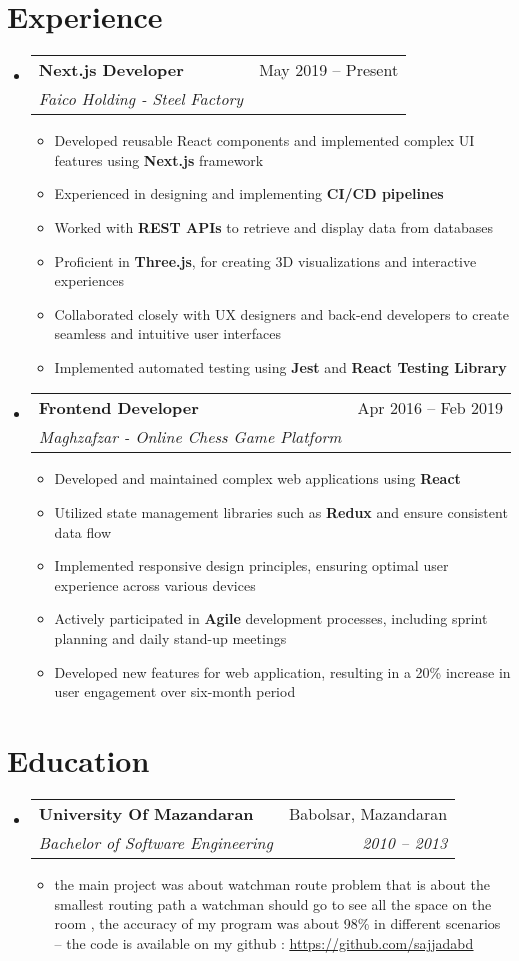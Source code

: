 \documentclass[a4paper,11pt]{article}
\makeatletter
\newcommand{\resumeItem}[1]{
  \item\small{#1}
}
\newcommand{\resumeItemListStart}{\begin{itemize}[rightmargin=0.11in]}
\newcommand{\resumeItemListEnd}{\end{itemize}}
\newcommand{\resumeQuadHeading}[4]{
  \item
  \begin{tabular*}{0.96\textwidth}[t]{l@{\extracolsep{\fill}}r}
    \textbf{#1} & #2 \\
    \textit{\small#3} & \textit{\small #4} \\
  \end{tabular*}
}
\newcommand{\resumeHeadingListStart}{
  \begin{itemize}[leftmargin=0.15in, label={}]
}
\newcommand{\resumeHeadingListEnd}{\end{itemize}}
\makeatother
\begin{document}

\section{Experience}
\resumeHeadingListStart{}
  \resumeQuadHeading{Next.js Developer}{May 2019 -- Present}
  {Faico Holding - Steel Factory}{}
    \resumeItemListStart{}
      \resumeItem{Developed reusable React components and implemented complex UI features using \textbf{Next.js} framework}
      \resumeItem{Experienced in designing and implementing \textbf{CI/CD pipelines} }
            \resumeItem{Worked with \textbf{REST APIs} to retrieve and display data from databases}
      \resumeItem{Proficient in \textbf{Three.js}, for creating 3D visualizations and interactive experiences}
      \resumeItem{Collaborated closely with UX designers and back-end developers to create seamless and intuitive user interfaces}
      \resumeItem{Implemented automated testing using \textbf{Jest} and \textbf{React Testing Library}}
    \resumeItemListEnd{}

  \resumeQuadHeading{Frontend Developer}{Apr 2016 -- Feb 2019}
  {Maghzafzar - Online Chess Game Platform}{}
    \resumeItemListStart{}
    	\resumeItem{Developed and maintained complex web applications using \textbf{React}}
	\resumeItem{Utilized state management libraries such as \textbf{Redux}  and ensure consistent data flow }
	\resumeItem{Implemented responsive design principles, ensuring optimal user experience across various devices}
    	 \resumeItem{Actively participated in \textbf{Agile} development processes, including sprint planning and daily stand-up meetings}
	\resumeItem{Developed new features for web application, resulting in a 20\% increase in user engagement over six-month period}
    \resumeItemListEnd{}


\resumeHeadingListEnd{}



\section{Education}
  \resumeHeadingListStart{}
    \resumeQuadHeading{University Of Mazandaran}{Babolsar, Mazandaran}
    {Bachelor of Software Engineering}{2010 – 2013}
	\begin{itemize}
	\item the main project was about watchman route problem that is about the smallest routing path a watchman should go to see all the space on the room , the accuracy of my program was about 98\% in different scenarios – the code is available on my github : \href{https://github.com/sajjadabd}{\uline{https://github.com/sajjadabd}}
	\end{itemize}
  \resumeHeadingListEnd{}
\end{document}
